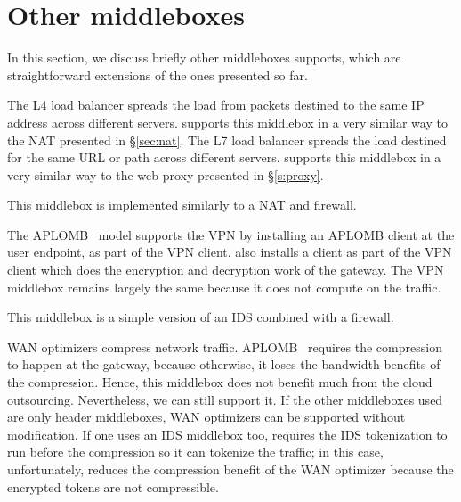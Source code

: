 
\section{Other middleboxes}\label{sec:vpn} \label{sec:other_apps} \label{sec:not_supp}\label{sec:loadb}

In this section, we discuss briefly other middleboxes \sys supports, which are straightforward extensions of the ones presented so far. 

The L4 load balancer spreads the load from packets destined to the same IP address across different servers. \sys supports this middlebox in a 
very similar way to the NAT presented in \S\ref{sec:nat}. The L7 load balancer spreads the load destined for the same URL or path across 
different servers. \sys supports this middlebox in a very similar way to the web proxy presented in \S\ref{s:proxy}. 


 This middlebox is implemented similarly to a NAT and firewall. 


 The APLOMB~\cite{aplomb} model supports the VPN by installing an APLOMB client at the user endpoint, as part of the VPN client.
\sys also installs a \sys client as part of the VPN client which does the encryption and decryption work of the gateway. The VPN middlebox remains
largely the same because it does not compute on the traffic. 


 This middlebox is a simple version of an IDS combined with a firewall. 


 WAN optimizers compress network traffic. APLOMB~\cite{aplomb} requires the compression to happen
at the gateway, because otherwise, it loses the bandwidth benefits of the compression. Hence, this middlebox does not benefit much 
 from the cloud outsourcing. 
Nevertheless, we can still support it. 
If the other middleboxes used are only header middleboxes, WAN optimizers can be  supported without modification.
If one uses an IDS middlebox too, \sys  requires  the IDS tokenization  to run before the compression so it can tokenize
the traffic; in this case, unfortunately, \sys  reduces the compression benefit of the WAN optimizer because the encrypted tokens 
are not compressible. 




%
%
%
%
%
%
%
%


